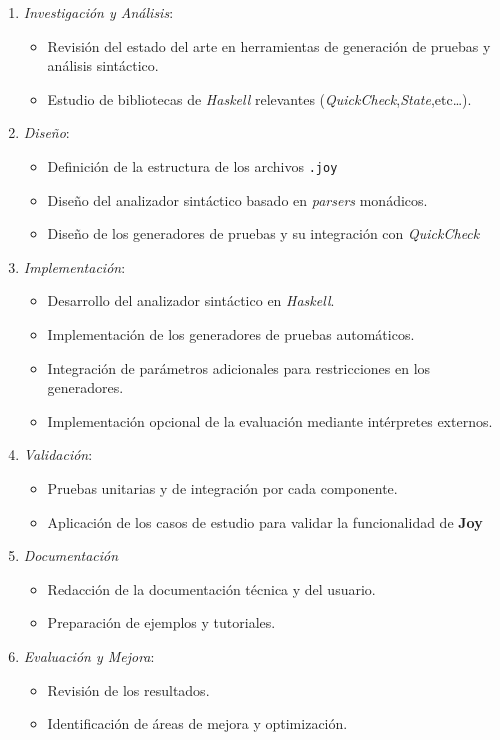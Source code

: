 \documentclass[12pt]{article}
\begin{document}
\begin{enumerate}
\item \textit{Investigación y Análisis}:

  \begin{itemize}
  \item Revisión del estado del arte en herramientas de generación de pruebas y análisis sintáctico.
  \item Estudio de bibliotecas de \textit{Haskell} relevantes (\textit{QuickCheck},\textit{State},etc\ldots).
  \end{itemize}
\item \textit{Diseño}:

  \begin{itemize}
  \item Definición de la estructura de los archivos \texttt{.joy}
  \item Diseño del analizador sintáctico basado en \textit{parsers} monádicos.
  \item Diseño de los generadores de pruebas y su integración con \textit{QuickCheck}
  \end{itemize}
\item \textit{Implementación}:

  \begin{itemize}
  \item Desarrollo del analizador sintáctico en \textit{Haskell}.
  \item Implementación de los generadores de pruebas automáticos.
  \item Integración de parámetros adicionales para restricciones en los generadores.
  \item Implementación opcional de la evaluación mediante intérpretes externos.
  \end{itemize}
\item \textit{Validación}:

  \begin{itemize}
  \item Pruebas unitarias y de integración por cada componente.
  \item Aplicación de los casos de estudio para validar la funcionalidad de \textbf{Joy}
  \end{itemize}
\item \textit{Documentación}
  
  \begin{itemize}
  \item Redacción de la documentación técnica y del usuario.
  \item Preparación de ejemplos y tutoriales.
  \end{itemize}

\item \textit{Evaluación y Mejora}:

  \begin{itemize}
  \item Revisión de los resultados.
  \item Identificación de áreas de mejora y optimización.
  \end{itemize}
\end{enumerate}
\end{document}
